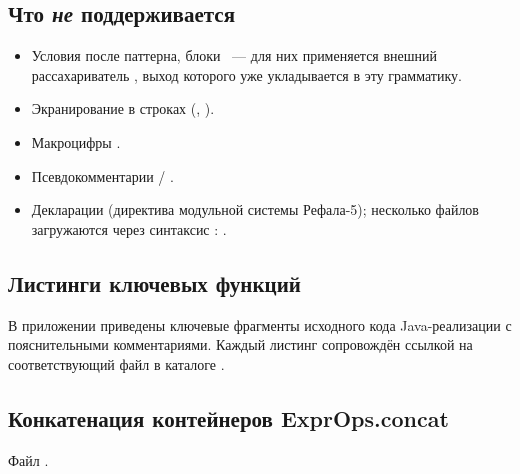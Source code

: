 \subsection*{Что \emph{не} поддерживается}

\begin{itemize}
  \item Условия  после паттерна, блоки \prog{\{ : \}}~--- для них применяется
        внешний рассахариватель , выход которого уже укладывается в эту
        грамматику.
  \item Экранирование в строках (, ).
  \item Макроцифры .
  \item Псевдокомментарии  / .
  \item Декларации  (директива модульной системы Рефала-5); несколько файлов
        загружаются через синтаксис \prog{+}: .
\end{itemize}

\clearpage
{}
\label{app:listings}

\subsection*{Листинги ключевых функций}

В приложении приведены ключевые фрагменты исходного кода Java-реализации
с пояснительными комментариями. Каждый листинг сопровождён ссылкой на
соответствующий файл в каталоге .

\subsection*{Конкатенация контейнеров ExprOps.concat}

Файл .

